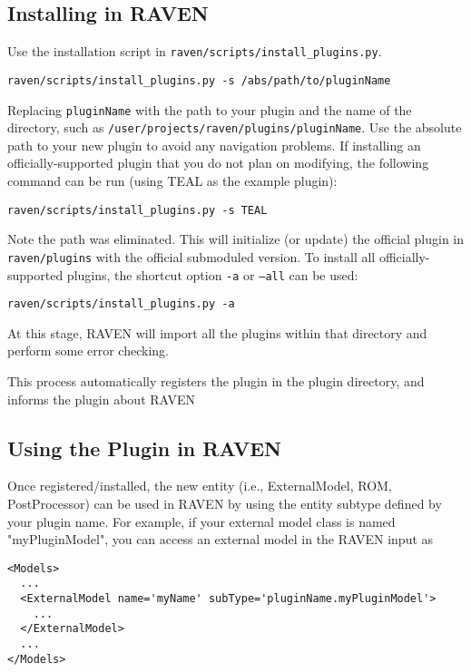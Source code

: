 \subsection{Installing in RAVEN}
Use the installation script in \texttt{raven/scripts/install\_plugins.py}.
\begin{lstlisting}[morekeywords={examplePlugin, pluginInstallation}]
  raven/scripts/install_plugins.py -s /abs/path/to/pluginName
\end{lstlisting}
Replacing \texttt{pluginName} with the path to your plugin and the name of the directory, such as
\texttt{/user/projects/raven/plugins/pluginName}.
Use the absolute path to your new plugin to avoid any navigation problems.
If installing an officially-supported plugin that you do not plan on modifying, the following command
can be run (using TEAL as the example plugin):
\begin{lstlisting}[morekeywords={examplePlugin, TEALInstallation}]
  raven/scripts/install_plugins.py -s TEAL
\end{lstlisting}
Note the path was eliminated. This will initialize (or update) the official plugin in
\texttt{raven/plugins} with the official submoduled version.
To install all officially-supported plugins, the shortcut option \texttt{-a} or \texttt{--all} can be used:
\begin{lstlisting}[morekeywords={examplePlugin, installAllPlugin}]
  raven/scripts/install_plugins.py -a
\end{lstlisting}
At this stage, RAVEN will import all the plugins within that directory and perform some error checking.

This process automatically registers the plugin in the plugin directory, and informs the plugin
about RAVEN %

\subsection{Using the Plugin in RAVEN}
Once registered/installed, the new entity (i.e., ExternalModel, ROM, PostProcessor) can be used in RAVEN by
using the entity subtype defined by your plugin name. For example, if your external model class is named "myPluginModel",
you can access an external model in the RAVEN input as

\begin{lstlisting}[morekeywords={usingPlugin}]
<Models>
  ...
  <ExternalModel name='myName' subType='pluginName.myPluginModel'>
    ...
  </ExternalModel>
  ...
</Models>
\end{lstlisting}

